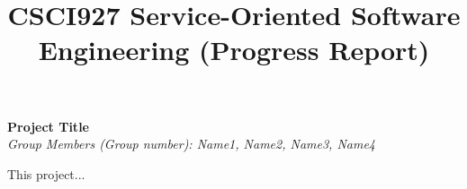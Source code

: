 \documentclass[runningheads]{llncs}
\begin{document}
\title{\large{CSCI927 Service-Oriented Software Engineering (Progress Report)}}
\author{}
\institute{}
\maketitle
\vspace{-1cm}



\begin{center}
\Large{\textbf{Project Title}} \\ %
\vspace{0.2cm}
\large{\emph{Group Members (Group number): Name1, Name2, Name3, Name4}} \\%
\vspace{0.3cm}
\end{center}

\noindent This project...
\end{document}
